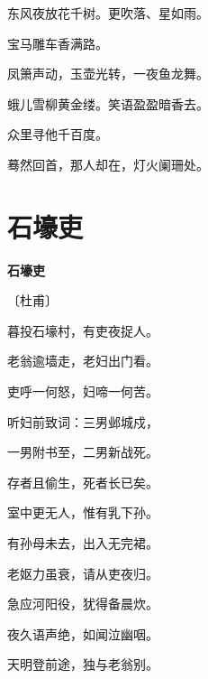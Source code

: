 \documentclass[12pt,UTF-8,openany,fontset=none]{ctexbook}
\begin{document}
\begin{center}
    \begin{Large}

        东风夜放花千树。更吹落、星如雨。

        宝马雕车香满路。

        凤箫声动，玉壶光转，一夜鱼龙舞。

        \vspace{18pt}  %

        蛾儿雪柳黄金缕。笑语盈盈暗香去。

        众里寻他千百度。

        蓦然回首，那人却在，灯火阑珊处。

    \end{Large}

\end{center}

\vspace{8pt}
\clearpage

\section{石壕吏}


\begin{center}
    {\bfseries 石壕吏}

    \vspace{18pt}

    \begin{large}\xuwen
        〔杜甫〕
    \end{large}

\end{center}

    \vspace{18pt}  %

\begin{center}
    \begin{Large}

        暮投石壕村，有吏夜捉人。

        老翁逾墙走，老妇出门看。

        吏呼一何怒，妇啼一何苦。

        听妇前致词：三男邺城戍，

        一男附书至，二男新战死。

        存者且偷生，死者长已矣。

        室中更无人，惟有乳下孙。

        有孙母未去，出入无完裙。

        老妪力虽衰，请从吏夜归。

        急应河阳役，犹得备晨炊。

        夜久语声绝，如闻泣幽咽。

        天明登前途，独与老翁别。

    \end{Large}

\end{center}
\end{document}
